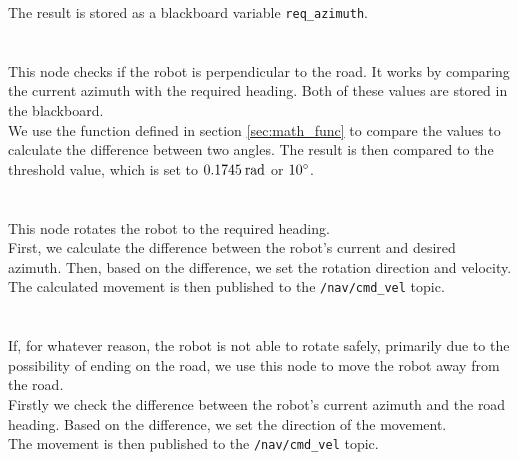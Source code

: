         The result is stored as a blackboard variable \texttt{req\_azimuth}.\\\\
    \\
        This node checks if the robot is perpendicular to the road. It works by comparing the current azimuth with the required heading. Both of these values are stored in the blackboard.\\
        We use the function defined in section \ref{sec:math_func} to compare the values to calculate the difference between two angles. The result is then compared to the threshold value, which is set to $0.1745\:\rm{rad}$ or $10\rm{^{\circ}}$.\\\\
    \\
        This node rotates the robot to the required heading.\\
        First, we calculate the difference between the robot's current and desired azimuth. Then, based on the difference, we set the rotation direction and velocity.\\
        The calculated movement is then published to the \texttt{/nav/cmd\_vel} topic.\\\\
    \\
        If, for whatever reason, the robot is not able to rotate safely, primarily due to the possibility of ending on the road, we use this node to move the robot away from the road.\\
        Firstly we check the difference between the robot's current azimuth and the road heading. Based on the difference, we set the direction of the movement.\\
        The movement is then published to the \texttt{/nav/cmd\_vel} topic.
